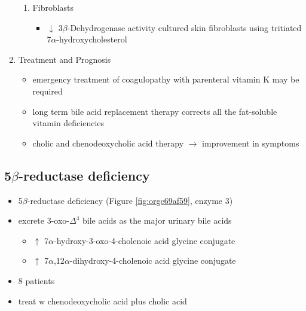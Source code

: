 \documentclass{scrartcl}
\begin{document}
\begin{enumerate}
\begin{enumerate}
\item Fibroblasts
\label{sec:org8026e36}
\begin{itemize}
\item \(\downarrow\) 3\(\beta\)-Dehydrogenase activity cultured skin fibroblasts using
tritiated 7\(\alpha\)-hydroxycholesterol
\end{itemize}
\end{enumerate}

\item Treatment and Prognosis
\label{sec:orgd1e8213}
\begin{itemize}
\item emergency treatment of coagulopathy with parenteral vitamin K may be required
\item long term bile acid replacement therapy corrects all the fat-soluble
vitamin deficiencies

\item cholic and chenodeoxycholic acid therapy \(\to\) improvement in symptoms
\end{itemize}
\end{enumerate}

\subsection{5\(\beta\)-reductase deficiency}
\label{sec:org3d96504}
\begin{itemize}
\item 5\(\beta\)-reductase deficiency (Figure \ref{fig:orgc69af59}, enzyme 3)
\item excrete 3-oxo-\(\Delta^{\text{4}}\) bile acids as the major urinary bile acids
\begin{itemize}
\item \(\uparrow\) 7\(\alpha\)-hydroxy-3-oxo-4-cholenoic acid glycine conjugate
\item \(\uparrow\) 7\(\alpha\),12\(\alpha\)-dihydroxy-4-cholenoic acid glycine conjugate
\end{itemize}
\item 8 patients
\item treat w chenodeoxycholic acid plus cholic acid
\end{itemize}
\end{document}
